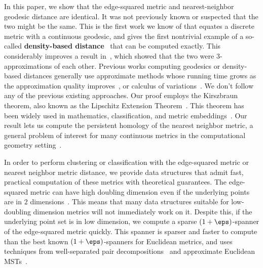 
In this paper, we show that the edge-squared metric and nearest-neighbor
geodesic distance are
identical. It was not previously known or
suspected that the two might be the same. This is the
first work we know of that equates a discrete metric with a
continuous geodesic, and gives the first nontrivial example of a
so-called \textbf{density-based distance}~\cite{sajama05estimatingDBDM} that can
be computed exactly. This considerably improves a result
in~\cite{cohen15approximating}, which showed that the two were
$3$-approximations of each other. Previous works computing
geodesics or density-based distances generally use approximate
methods whose running time grows as the approximation
quality improves~\cite{Kimmel98, tenenbaum00global,
alamgir12shortest, agarwal16efficient, hwang2016,
cohen15approximating}, or
calculus of variations~\cite{bernoulli, Schwarzschild, Sussmann97}.
We don't follow any of the previous existing approaches. Our proof employs
the Kirszbraun theorem, also known as the Lipschitz
Extension Theorem~\cite{Kirszbraun1934, brehm1981}. This theorem has been
widely used in mathematics, classification, and metric
embeddings~\cite{Naor06, Lee05, Naor15, Gottlieb14, Gottlieb17}.
Our result lets us compute the persistent
homology of the nearest neighbor metric, a general problem of interest for
many continuous metrics in the computational geometry
setting~\cite{edelsbrunner02topological,gasparovic17complete,chazal08towards,chazal13persistence,carlsson09topology}.

In order to perform clustering or classification with the edge-squared
metric or nearest neighbor metric distance, we
provide data structures that admit fast, practical
computation of these metrics with theoretical guarantees. The
edge-squared metric can have high doubling
dimension even if the underlying points are in $2$
dimensions~\cite{cohen15approximating}. This
means that many data structures suitable for low-doubling dimension
metrics will not immediately
work on it. Despite this, if the underlying point set is in low dimension,
we compute a sparse $(1+\eps)$-spanner of
the edge-squared metric quickly.
This spanner is sparser and faster to compute than the
best known $(1+\eps)$-spanners for Euclidean metrics, and uses
techniques from well-separated pair
decompositions~\cite{Callahan1993} and
approximate Euclidean MSTs~\cite{arya95euclid, Arya2016,
Callahan1995}.

